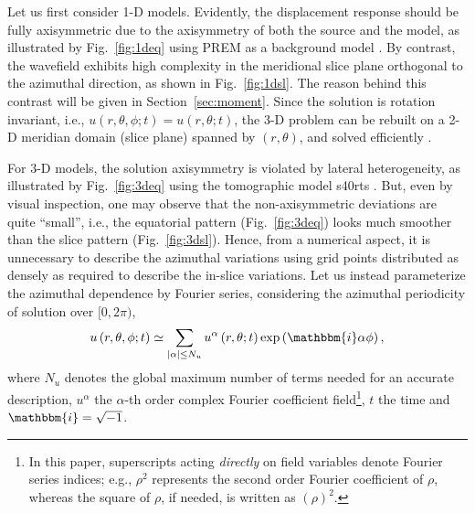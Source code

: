 \documentclass[extra,referee]{gji}
\begin{document}
Let us first consider 1-D models. Evidently, the displacement response 
should be fully axisymmetric due to the axisymmetry of both the source 
and the model, as illustrated by Fig.~\ref{fig:1deq} using PREM as a 
background model \cite[]{dziewonski1981prem}.
By contrast, the wavefield exhibits high complexity in the meridional 
slice plane orthogonal to the azimuthal direction, as shown in Fig.~\ref{fig:1dsl}. 
The reason behind this contrast will be given in Section~\ref{sec:moment}.
Since the solution is rotation invariant, i.e., 
$u\left(r,\theta,\phi; t\right)=u\left(r,\theta; t\right)$, 
the 3-D problem can be rebuilt on a 2-D meridian domain (slice plane)
spanned by $\left(r,\theta\right)$, 
and solved efficiently \cite[]{nissen2014axisem}. 

For 3-D models, the solution axisymmetry is violated by lateral 
heterogeneity, as illustrated by Fig.~\ref{fig:3deq}
using the tomographic model s40rts 
\cite[]{ritsema2011s40rts}. But, even by visual inspection, 
one may observe that the non-axisymmetric deviations are quite ``small'', 
i.e., the equatorial pattern (Fig.~\ref{fig:3deq}) looks much smoother 
than the slice pattern (Fig.~\ref{fig:3dsl}). 
Hence, from a numerical aspect, it is unnecessary to describe the azimuthal 
variations using grid points distributed as densely as required to 
describe the in-slice variations. Let us instead parameterize 
the azimuthal dependence by Fourier series, considering the azimuthal
periodicity of solution over $[0,2\pi)$, 
\begin{equation}  
  u\left(r,\theta,\phi;t\right) \simeq \sum_{|\alpha| \le N_u} 
  u^\alpha\left(r,\theta;t\right)\exp\left(\mathbbm{i}\alpha\phi\right),
  \label{eq:demo}
\end{equation}
where $N_u$ denotes the global maximum number of terms needed for an accurate 
description, $u^\alpha$ the $\alpha$-th order complex Fourier coefficient 
field\footnote{In this paper, superscripts acting \textit{directly} on 
field variables denote Fourier series indices; e.g., $\rho^2$ represents the 
second order Fourier coefficient of $\rho$, whereas the square of $\rho$, if
needed, is written as $\left(\rho\right)^2$.}, 
$t$ the time and $\mathbbm{i}=\sqrt{-1}$. 
\end{document}
